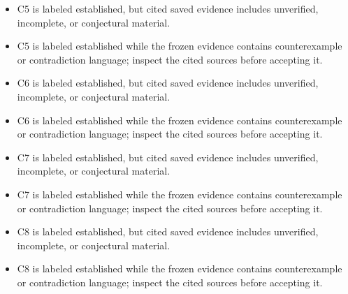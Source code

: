 \documentclass[11pt]{article}
\begin{document}
\begin{itemize}
\item C5 is labeled established, but cited saved evidence includes unverified, incomplete, or conjectural material.
\item C5 is labeled established while the frozen evidence contains counterexample or contradiction language; inspect the cited sources before accepting it.
\item C6 is labeled established, but cited saved evidence includes unverified, incomplete, or conjectural material.
\item C6 is labeled established while the frozen evidence contains counterexample or contradiction language; inspect the cited sources before accepting it.
\item C7 is labeled established, but cited saved evidence includes unverified, incomplete, or conjectural material.
\item C7 is labeled established while the frozen evidence contains counterexample or contradiction language; inspect the cited sources before accepting it.
\item C8 is labeled established, but cited saved evidence includes unverified, incomplete, or conjectural material.
\item C8 is labeled established while the frozen evidence contains counterexample or contradiction language; inspect the cited sources before accepting it.
\end{itemize}
\end{document}

